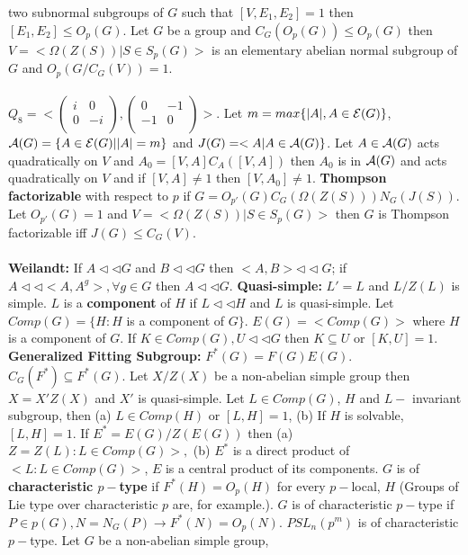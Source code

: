 two subnormal subgroups of $G$ 
such that $[V,E_1 , E_2 ]=1$ then $[E_1 , E_2 ] \le O_p (G)$.  Let $G$ be a group
and $C_G(O_p(G)) \le O_p(G)$ then $V=< \Omega(Z(S)) | S \in S_p(G)>$ is an
elementary abelian normal subgroup of $G$ and $O_p(G/C_G(V))=1$.\\
\\
$Q_8= <
\left(
\begin{array}{cc}
i & 0 \\
0 & -i \\
\end{array}
\right),
\left(
\begin{array}{cc}
0 & -1 \\
-1 & 0 \\
\end{array}
\right)>$.
Let $m= max \{ |A|, A \in {\cal E}(G) \}$, ${\cal A}(G)= \{A \in {\cal E}(G) | |A|=m \}$
and $J(G)= < A | A \in {\cal A}(G) \}$.  Let $A \in {\cal A}(G)$ acts quadratically
on $V$ and $A_0 = [V,A] C_A([V,A])$ then $A_0$ is in ${\cal A}(G)$ and acts quadratically
on $V$ and if $[V,A] \ne 1$ then $[V, A_0 ] \ne 1$.  {\bf Thompson factorizable}
with respect
to $p$ if $G=O_{p'}(G) C_G( \Omega(Z(S))) N_G(J(S))$.  Let $O_{p'}(G)=1$ and
$V= < \Omega (Z(S)) | S \in S_p(G)>$ then $G$ is Thompson factorizable iff
$J(G) \le C_G(V)$.\\
\\
{\bf Weilandt:} If 
$A \lhd \lhd G$ and $B \lhd \lhd G$ then $<A, B> \lhd \lhd G$; 
if $A \lhd \lhd <A,A^g>, \forall g \in G$ then $A \lhd \lhd G$.
{\bf Quasi-simple:} $L'=L$ and $L/Z(L)$ is simple.  $L$ is a {\bf component} of $H$ if
$L \lhd \lhd H$ and $L$ is quasi-simple.  Let $Comp(G)= \{H: H$ is a component of $G \}$.
$E(G)= <Comp(G)>$ where $H$ is a component of $G$.  
If $K \in Comp(G), U \lhd \lhd G$ then $K \subseteq U$ or $[K,U]=1$.
{\bf Generalized Fitting Subgroup:} $F^*(G)=F(G)E(G)$. $C_G(F^*) \subseteq F^*(G)$. 
Let $X/Z(X)$ be a non-abelian simple group then $X=X'Z(X)$ and $X'$ is
quasi-simple.  Let $L \in Comp(G)$, $H$ and $L-$ invariant subgroup, then
(a) $L \in Comp(H)$ or $[L,H]=1$, (b) If $H$ is solvable, $[L,H]=1$.
If $E^*=E(G)/Z(E(G))$ then (a)$Z=Z(L): L \in Comp(G)>,$ 
(b) $E^*$ is a direct product of $<L: L \in Comp(G)>$,
$E$ is a central product of its components.
$G$ is of {\bf characteristic $p-$type}
if  $F^*(H)=O_p(H)$ for every $p-$local, $H$ (Groups of Lie type over characteristic
$p$ are, for example.).
$G$ is of characteristic $p-$type if $P \in p(G), N= N_G(P) \rightarrow F^*(N)=O_p(N)$.
$PSL_n(p^m)$ is of characteristic $p-$type.  Let $G$ be a non-abelian simple group,
